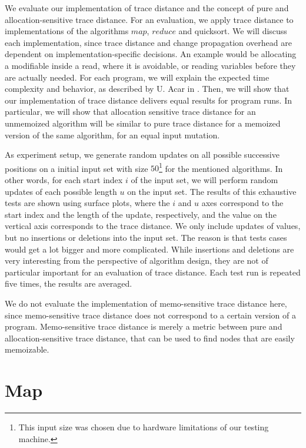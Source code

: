 We evaluate our implementation of trace distance and the concept of pure and allocation-sensitive trace distance. For an evaluation, we apply trace distance to implementations of the algorithms $map$, $reduce$ and quicksort. We will discuss each implementation, since trace distance and change propagation overhead are dependent on implementation-specific decisions. An example would be allocating a modifiable inside a read, where it is avoidable, or reading variables before they are actually needed. For each program, we will explain the expected time complexity and behavior, as described by U. Acar in \cite{Acar2005thesis}. Then, we will show that our implementation of trace distance delivers equal results for program runs. In particular, we will show that allocation sensitive trace distance for an unmemoized algorithm will be similar to pure trace distance for a memoized version of the same algorithm, for an equal input mutation. 

As experiment setup, we generate random updates on all possible successive positions on a initial input set with size $50$\footnote{This input size was chosen due to hardware limitations of our testing machine.} for the mentioned algorithms. In other words, for each start index $i$ of the input set, we will perform random updates of each possible length $u$ on the input set. The results of this exhaustive tests are shown using surface plots, where the $i$ and $u$ axes correspond to the start index and the length of the update, respectively, and the value on the vertical axis corresponds to the trace distance. We only include updates of values, but no insertions or deletions into the input set. The reason is that tests cases would get a lot bigger and more complicated. While insertions and deletions are very interesting from the perspective of algorithm design, they are not of particular important for an evaluation of trace distance. Each test run is repeated five times, the results are averaged. 

We do not evaluate the implementation of memo-sensitive trace distance here, since memo-sensitive trace distance does not correspond to a certain version of a program. Memo-sensitive trace distance is merely a metric between pure and allocation-sensitive trace distance, that can be used to find nodes that are easily memoizable. 

\section{Map}

